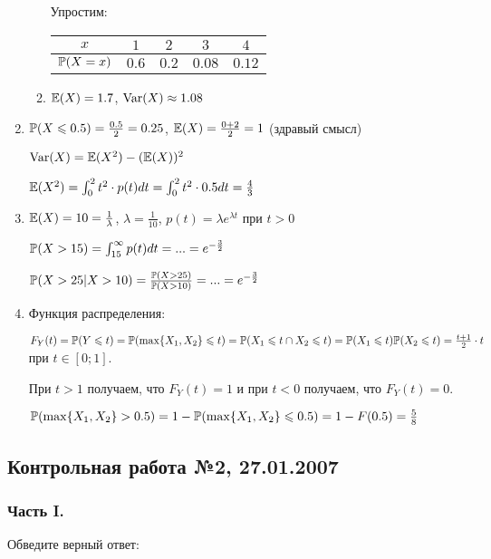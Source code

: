 \begin{enumerate}
\begin{enumerate}
Упростим:

\begin{tabular}{@{}ccccc@{}}
\toprule
$x$       & $1$   & $2$   & $3$    & $4$    \\ \midrule
$\P(X=x)$ & $0.6$ & $0.2$ & $0.08$ & $0.12$ \\ \bottomrule
\end{tabular}
\item $\E(X)=1.7$, $\Var(X)\approx 1.08$
\end{enumerate}
\item  $\P(X\le 0.5)=\frac{0.5}{2}=0.25$, $\E(X)=\frac{0+2}{2}=1$ (здравый смысл)

$\Var(X)=\E(X^{2})-(\E(X))^{2}$

$\E(X^{2})=\int_{0}^{2}t^{2}\cdot p(t)dt=\int_{0}^{2}t^{2}\cdot 0.5dt=\frac{4}{3}$
\item $\E(X)=10=\frac{1}{\lambda}$, $\lambda=\frac{1}{10}$, $p(t)=\lambda e^{\lambda t}$ при $t>0$

$\P(X>15)=\int_{15}^{\infty}p(t)dt=...=e^{-\frac{3}{2}}$

$\P(X>25|X>10)=\frac{\P(X>25)}{\P(X>10)}=...=e^{-\frac{3}{2}}$
\item Функция распределения:

$F_{Y}(t)=\P(Y\le t)=\P(\max\{X_{1},X_{2}\}\le t)=\P(X_{1}\le t\cap X_{2}\le t)=\P(X_{1}\le t)\P(X_{2}\le t)=\frac{t+1}{2}\cdot t$ при $t\in [0;1]$.

При $t>1$ получаем, что $F_{Y}(t)=1$ и при $t<0$ получаем, что $F_{Y}(t)=0$.

$\P(\max\{X_{1},X_{2}\}>0.5)=1-\P(\max\{X_{1},X_{2}\}\le 0.5)=1-F(0.5)=\frac{5}{8}$
\end{enumerate}

\subsection{Контрольная работа №2, 27.01.2007}

\subsubsection*{Часть I.}

Обведите верный ответ:

